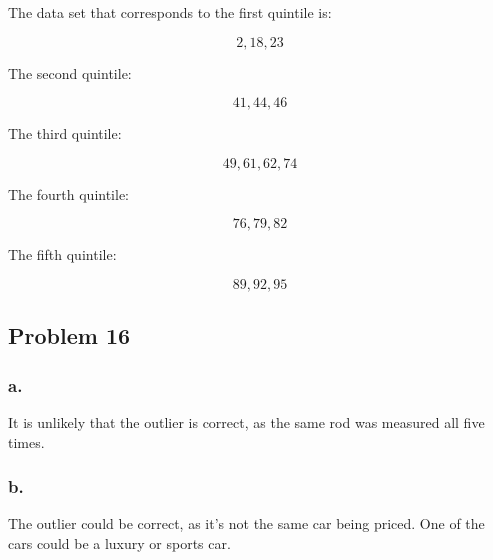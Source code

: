 \documentclass[11pt]{article}
\begin{document}
The data set that corresponds to the first quintile is:

\[2,18,23\]

The second quintile:

\[41,44,46\]

The third quintile:

\[49,61,62,74\]

The fourth quintile:

\[76,79,82\]

The fifth quintile:

\[89, 92, 95\]

\subsection*{Problem 16}
\subsubsection*{a.}
It is unlikely that the outlier is correct, as the same rod was measured all
five times. 

\subsubsection*{b.}
The outlier could be correct, as it's not the same car being priced. One of the
cars could be a luxury or sports car. 
\end{document}
